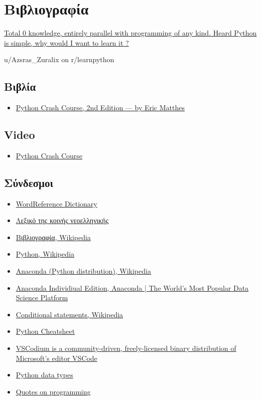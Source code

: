 \documentclass[14pt]{extreport}
\begin{document}
\chapter{Βιβλιογραφία}
\epigraph{\href{https://tinyurl.com/ycnad9ch}
    {Total 0 knowledge, entirely parallel with programming of any kind.
        Heard Python is simple, why would I want to learn it ?
    }
}{u/Azsras\_Zuralix on r/learnpython}
\newpage
\section{Βιβλία}
\begin{itemize}\itemsep0cm
    \item \href{https://tinyurl.com/y7l2a48c}{Python Crash Course, 2nd
              Edition — by Eric Matthes}
\end{itemize}
\section{Video}
\begin{itemize}\itemsep0cm
    \item \href{https://tinyurl.com/ya8wk4xm}{Python Crash Course}
\end{itemize}
\section{Σύνδεσμοι}
\begin{itemize}\itemsep0cm
    \item \href{https://tinyurl.com/yyzfa2bg}{WordReference Dictionary}
    \item \href{https://tinyurl.com/o5vxal7}{Λεξικό της κοινής νεοελληνικής}
    \item \href{https://tinyurl.com/y9q2elk4}{Βιβλιογραφία, Wikipedia}
    \item \href{https://tinyurl.com/y9g9nkh2}{Python, Wikipedia}
    \item \href{https://tinyurl.com/ycy6jsw5}{Anaconda (Python distribution),
              Wikipedia}
    \item \href{https://tinyurl.com/y7rogsec}{Anaconda Individiual Edition,
              Anaconda | The World's Most Popular Data Science Platform}
    \item \href{https://tinyurl.com/ogoqf2p}{Conditional statements, Wikipedia}
    \item \href{https://tinyurl.com/y8y59y44}{Python Cheatsheet}
    \item \href{https://tinyurl.com/y54gclet}{VSCodium is a community-driven,
              freely-licensed binary distribution of Microsoft’s editor VSCode}
    \item \href{https://www.tutorialsteacher.com/python/python-data-types}{Python data types}
    \item \href{https://www.goodreads.com/quotes/tag/programming}{Quotes on programming}
\end{itemize}
\end{document}
